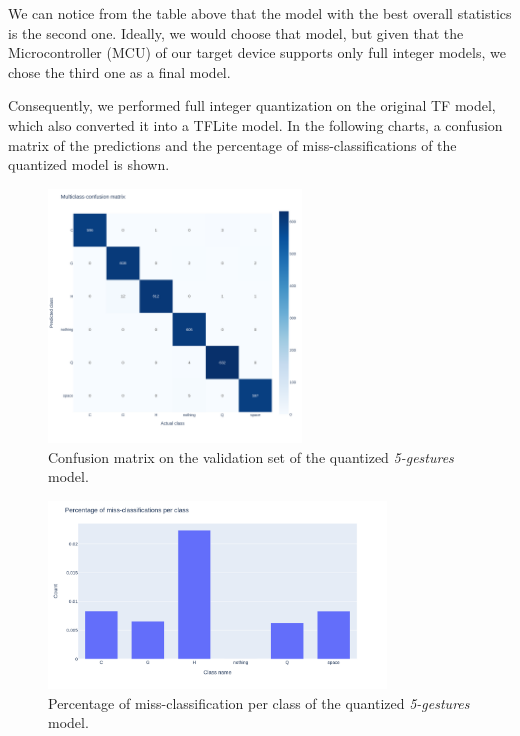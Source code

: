 \documentclass{Configuration_Files/PoliMi3i_thesis}
\begin{document}
We can notice from the table above that the model with the best overall statistics is the second one. Ideally, we would choose that model, but given that the Microcontroller (MCU) of our target device supports only full integer models, we chose the third one as a final model. 

Consequently, we performed full integer quantization on the original TF model, which also converted it into a TFLite model. In the following charts, a confusion matrix of the predictions and the percentage of miss-classifications of the quantized model is shown.
\begin{figure}[H]
   \centering
   \includegraphics[width=0.6\textwidth]{Figures/5-gestures/5_cm_quant.png}
   \caption{Confusion matrix on the validation set of the quantized \textit{5-gestures} model.}
   \label{fig:5_cmatrix_quant}
\end{figure}

\begin{figure}[H]
   \centering
   \includegraphics[width=0.8\textwidth]{Figures/5-gestures/5_quant_errors.png}
   \caption{Percentage of miss-classification per class of the quantized \textit{5-gestures} model.}
   \label{fig:5_errors_quant}
\end{figure}
\end{document}
